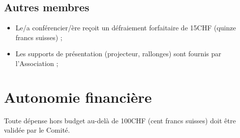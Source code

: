 \documentclass[12pt,twoside]{report}
\begin{document}
\section*{Autres membres}
\begin{itemize}
\item Le/a conférencier/ère reçoit un défraiement forfaitaire de 15CHF (quinze francs suisses) ;
\item Les supports de présentation (projecteur, rallonges) sont fournis par l’Association ;
\end{itemize}

\chapter*{Autonomie financière}
Toute dépense hors budget au-delà de 100CHF (cent francs suisses) doit être validée par le Comité.
\end{document}
